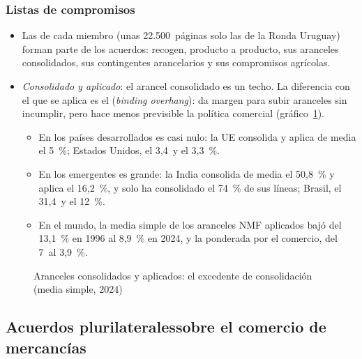 \documentclass[11pt]{article}
\begin{document}
\subsubsection{Listas de compromisos}\label{sec:listas}

\begin{itemize}
\item Las  de cada miembro (unas 22.500~páginas solo las de la Ronda Uruguay) forman parte de los acuerdos: recogen, producto a producto, sus aranceles consolidados, sus contingentes arancelarios y sus compromisos agrícolas.
\item \emph{Consolidado y aplicado}: el arancel consolidado es un techo. La diferencia con el que se aplica es el  (\emph{binding overhang}): da margen para subir aranceles sin incumplir, pero hace menos previsible la política comercial (gráfico~\ref{fig:consolidados}).
  \begin{itemize}
  \item En los países desarrollados es casi nulo: la UE consolida y aplica de media el 5~\%; Estados Unidos, el 3,4~y el 3,3~\%.
  \item En los emergentes es grande: la India consolida de media el 50,8~\% y aplica el 16,2~\%, y solo ha consolidado el 74~\% de sus líneas; Brasil, el 31,4~y el 12~\%.
  \item En el mundo, la media simple de los aranceles NMF aplicados bajó del 13,1~\% en 1996 al 8,9~\% en 2024, y la ponderada por el comercio, del 7~al 3,9~\%\nocite{OMC2026BlogNMF}.
  \end{itemize}
\end{itemize}

\begin{figure}[H]
\centering
\caption{Aranceles consolidados y aplicados: el excedente de consolidación (media simple, 2024)}\label{fig:consolidados}
\end{figure}

\subsection{Acuerdos plurilaterales\cortetitulo sobre el comercio de mercancías}\label{sec:plurilaterales}
\end{document}
